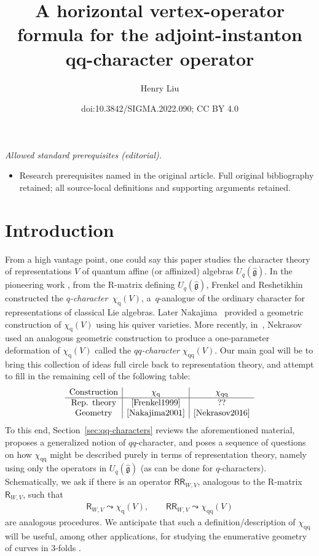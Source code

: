 \documentclass[10pt,a4paper]{amsart}
\title{A horizontal vertex-operator formula for the adjoint-instanton qq-character operator}
\author{Henry Liu}
\date{doi:10.3842/SIGMA.2022.090; CC BY 4.0}
\numberwithin{equation}{section}
\renewcommand{\hat}[1]{\widehat{#1}}
\newcommand{\lie}[1]{\mathfrak{#1}}
\newcommand{\sR}{\mathsf{R}}
\newcommand{\sRR}{\mathsf{RR}}
\newcommand{\chiq}{\chi_{\mathrm{q}}}
\newcommand{\chiqq}{\chi_{\mathrm{qq}}}
\begin{document}
\maketitle
\noindent\textit{Allowed standard prerequisites (editorial).}\begin{itemize}
\item Research prerequisites named in the original article. Full original bibliography retained; all source-local definitions and supporting arguments retained.
\end{itemize}\medskip
\section{Introduction}

From a high vantage point, one could say this paper studies the
character theory of representations $V$ of quantum affine (or
affinized) algebras $U_q(\hat{\lie{g}})$. In the pioneering work
\cite{Frenkel1999}, from the R-matrix defining $U_q(\hat{\lie{g}})$,
Frenkel and Reshetikhin constructed the {\it $q$-character}~$\chiq(V)$, a~$q$-analogue of the ordinary character for
representations of classical Lie algebras. Later Nakajima~\cite{Nakajima2001} provided a geometric construction of $\chiq(V)$
using his quiver varieties. More recently, in~\cite{Nekrasov2016},
Nekrasov used an analogous geometric construction to produce a
one-parameter deformation of $\chiq(V)$ called the {\it
 $qq$-character} $\chiqq(V)$. Our main goal will be to bring this
collection of ideas full circle back to representation theory, and
attempt to fill in the remaining cell of the following table:
\[ \begin{array}{c|c|c}
 \text{Construction} & \chiq & \chiqq \\ \hline
 \text{Rep. theory} & \cite{Frenkel1999} & ?? \\
 \text{Geometry} & \cite{Nakajima2001} & \cite{Nekrasov2016}
 \end{array} \]
To this end, Section~\ref{sec:qq-characters} reviews the aforementioned
material, proposes a generalized notion of $qq$-character, and poses a
sequence of questions on how $\chiqq$ might be described purely in
terms of representation theory, namely using only the operators in
$U_q(\hat{\lie{g}})$ (as can be done for $q$-characters).
Schematically, we ask if there is an operator $\sRR_{W,V}$, analogous
to the R-matrix $\sR_{W,V}$, such that
\begin{gather} \label{eq:R-vs-RR-analogy}
 \sR_{W,V}\leadsto \chiq(V), \qquad
\sRR_{W,V}\leadsto \chiqq(V)
\end{gather}
are analogous procedures. We anticipate that such a
definition/description of $\chiqq$ will be useful, among other
applications, for studying the enumerative geometry of curves in
3-folds \cite{Liu2021}.
\end{document}
